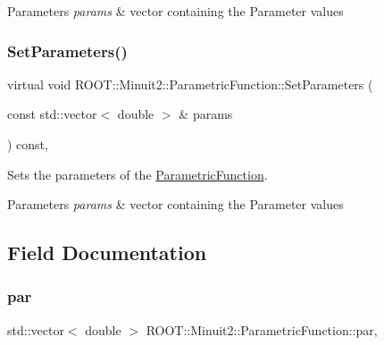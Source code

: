 \begin{DoxyParams}{Parameters}
{\em params} & vector containing the Parameter values \\
\hline
\end{DoxyParams}
\mbox{\label{classROOT_1_1Minuit2_1_1ParametricFunction_a63417244db376ec27f2c85ee6432f552}} 
\subsubsection{\texorpdfstring{SetParameters()}{SetParameters()}\hspace{0.1cm}{\footnotesize\ttfamily [3/3]}}
{\footnotesize\ttfamily virtual void R\+O\+O\+T\+::\+Minuit2\+::\+Parametric\+Function\+::\+Set\+Parameters (\begin{DoxyParamCaption}\item[{const std\+::vector$<$ double $>$ \&}]{params }\end{DoxyParamCaption}) const\hspace{0.3cm}{\ttfamily [inline]}, {\ttfamily [virtual]}}

Sets the parameters of the \mbox{\hyperlink{classROOT_1_1Minuit2_1_1ParametricFunction}{Parametric\+Function}}.


\begin{DoxyParams}{Parameters}
{\em params} & vector containing the Parameter values \\
\hline
\end{DoxyParams}


\subsection{Field Documentation}
\mbox{\label{classROOT_1_1Minuit2_1_1ParametricFunction_aae3e17582748a80c3ff5eef35b8ca9ca}} 
\subsubsection{\texorpdfstring{par}{par}}
{\footnotesize\ttfamily std\+::vector$<$ double $>$ R\+O\+O\+T\+::\+Minuit2\+::\+Parametric\+Function\+::par\hspace{0.3cm}{\ttfamily [mutable]}, {\ttfamily [protected]}}

